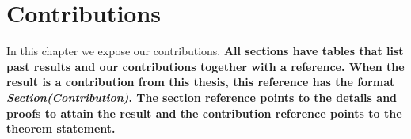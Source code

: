 \chapter{Contributions}

In this chapter we expose our contributions.
%
\textbf{%
All sections have tables that list
past results and our contributions together with a reference.
When the result is a
contribution from this thesis, this reference has the format
\emph{Section(Contribution)}. The section reference points to the
details and proofs to attain the result and the contribution reference
points to the theorem statement.%
}





